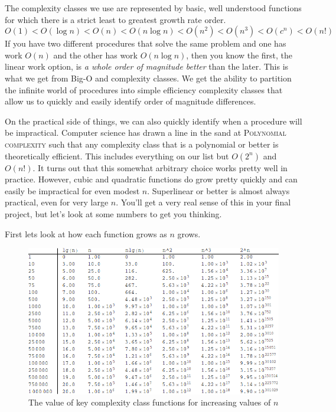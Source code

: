 \documentclass[]{tufte-handout}
\begin{document}
The complexity classes we use are represented by basic, well understood functions for which there is a strict least to greatest growth rate order.
\[
O(1) < O(\log n) < O(n) < O(n \log n) < O(n^2) < O(n^3) < O(c^n) < O(n!)
\]
If you have two different procedures that solve the same problem and one has work $O(n)$ and the other has work $O(n \log n)$, then you know the first, the linear work option, is \textit{a whole order of magnitude better} than the later. This is what we get from Big-O and complexity classes. We get the ability to partition the infinite world of procedures into simple efficiency complexity classes that allow us to quickly and easily identify order of magnitude differences.

On the practical side of things, we can also quickly identify when a procedure will be impractical. Computer science has drawn a line in the sand at \textsc{Polynomial complexity} such that any complexity class that is a polynomial or better is theoretically efficient. This includes everything on our list but $O(2^n)$ and $O(n!)$. It turns out that this somewhat arbitrary choice works pretty well in practice. However, cubic and quadratic functions do grow pretty quickly and can easily be impractical for even modest $n$.  Superlinear or better is almost always practical, even for very large $n$.  You'll get a very real sense of this in your final project, but let's look at some numbers to get you thinking.


First lets look at how each function grows as $n$ grows.
\begin{figure}
\includegraphics[scale=0.45]{nvals.png}
\caption{The value of key complexity class functions for increasing values of $n$}
\end{figure}
\end{document}
